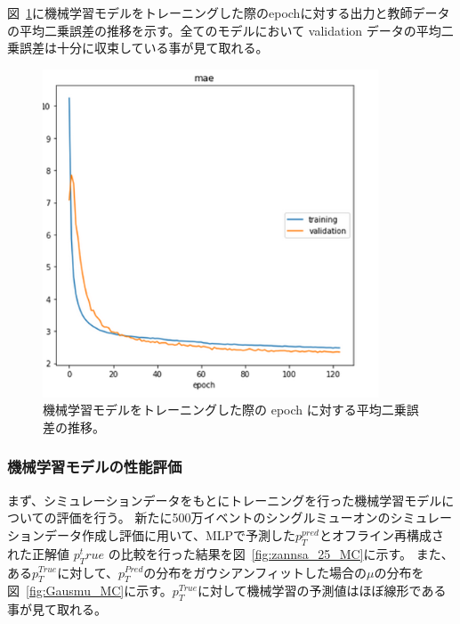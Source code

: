 図~\ref{fig:epoch}に機械学習モデルをトレーニングした際のepochに対する出力と教師データの平均二乗誤差の推移を示す。全てのモデルにおいて validation データの平均二乗誤差は十分に収束している事が見て取れる。

\begin{figure}[tb]
  \centering
  \includegraphics[clip, width=10cm]{fig/4/epoch2.png}
  \caption{機械学習モデルをトレーニングした際の epoch に対する平均二乗誤差の推移。}
  \label{fig:epoch}
\end{figure}


\subsubsection{機械学習モデルの性能評価}
まず、シミュレーションデータをもとにトレーニングを行った機械学習モデルについての評価を行う。
新たに500万イベントのシングルミューオンのシミュレーションデータ作成し評価に用いて、MLPで予測した$p_{T}^{pred}$とオフライン再構成された正解値 $p_{T}^true$ の比較を行った結果を図~\ref{fig:zannsa_25_MC}に示す。
また、ある$p_T^{True}$に対して、$p_T^{Pred}$の分布をガウシアンフィットした場合の$\mu$の分布を図~\ref{fig:Gausmu_MC}に示す。$p_T^{True}$に対して機械学習の予測値はほぼ線形である事が見て取れる。

